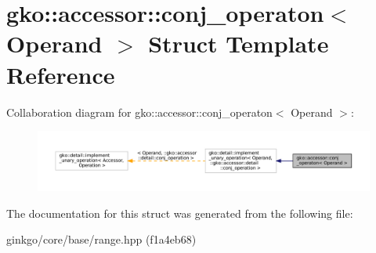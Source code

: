 \hypertarget{structgko_1_1accessor_1_1conj__operaton}{}\section{gko\+:\+:accessor\+:\+:conj\+\_\+operaton$<$ Operand $>$ Struct Template Reference}
\label{structgko_1_1accessor_1_1conj__operaton}


Collaboration diagram for gko\+:\+:accessor\+:\+:conj\+\_\+operaton$<$ Operand $>$\+:
\nopagebreak
\begin{figure}[H]
\begin{center}
\leavevmode
\includegraphics[width=350pt]{structgko_1_1accessor_1_1conj__operaton__coll__graph}
\end{center}
\end{figure}


The documentation for this struct was generated from the following file\+:\begin{DoxyCompactItemize}
\item 
ginkgo/core/base/range.\+hpp (f1a4eb68)\end{DoxyCompactItemize}
